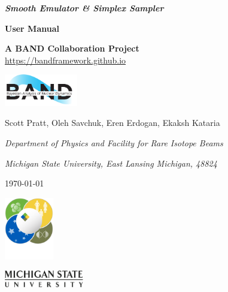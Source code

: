 \documentclass[12pt]{article}
\numberwithin{equation}{section}
\numberwithin{figure}{section}
\begin{document}
\begin{titlepage}
   \begin{center}
       \vspace*{1.5cm}

       {\bf\LARGE {\it Smooth Emulator \&  Simplex Sampler}}\\
       \vspace*{8pt}

       {\bf\Large User Manual}

       {\bf A BAND Collaboration Project}\\
       \href{https://bandframework.github.io}{https://bandframework.github.io}
       
       \begin{center}
     
       \includegraphics[width=0.24\textwidth]{figs/BAND_logo.png}
      \end{center}
      


       \vspace{0.25cm}

       {\large Scott Pratt, Oleh Savchuk, Eren Erdogan, Ekaksh Kataria}

       {\it Department of Physics and Facility for Rare Isotope Beams}

       {\it Michigan State University, East Lansing Michigan, 48824}

       \today
  \end{center}
       
    \vspace*{3.0cm}
     

     \hspace*{2.0cm}
      \includegraphics[width=0.16\textwidth]{figs/FRIB_logo.png}

       \vspace*{-3cm}
       \hspace*{6.35cm}
       \includegraphics[width=0.26\textwidth]{figs/msu_logo}


\end{titlepage}
\end{document}
